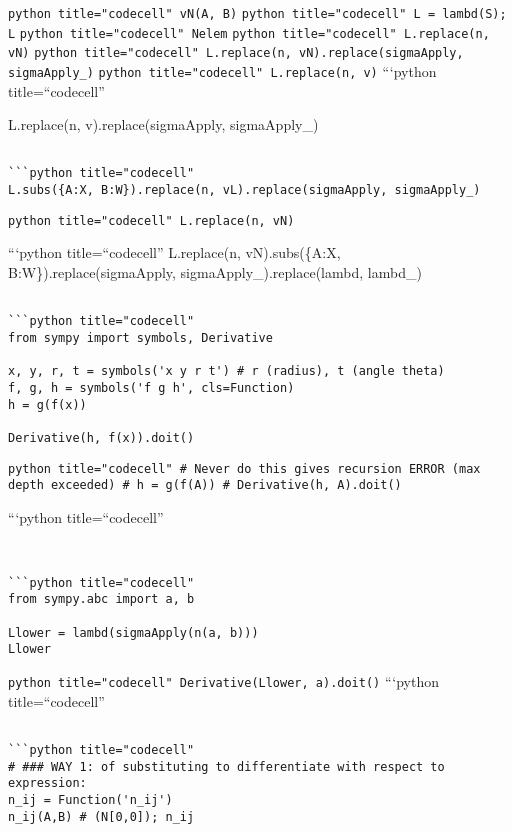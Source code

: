 \documentclass[
]{article}
\begin{document}
\texttt{python title="codecell" vN(A, B)}
\texttt{python title="codecell" L = lambd(S); L}
\texttt{python title="codecell" Nelem}
\texttt{python title="codecell" L.replace(n, vN)}
\texttt{python title="codecell" L.replace(n, vN).replace(sigmaApply, sigmaApply_)}
\texttt{python title="codecell" L.replace(n, v)} ```python
title=``codecell''

L.replace(n, v).replace(sigmaApply, sigmaApply\_)

\begin{verbatim}

```python title="codecell"
L.subs({A:X, B:W}).replace(n, vL).replace(sigmaApply, sigmaApply_)
\end{verbatim}

\texttt{python title="codecell" L.replace(n, vN)}

```python title=``codecell'' L.replace(n, vN).subs(\{A:X,
B:W\}).replace(sigmaApply, sigmaApply\_).replace(lambd, lambd\_)

\begin{verbatim}

```python title="codecell"
from sympy import symbols, Derivative

x, y, r, t = symbols('x y r t') # r (radius), t (angle theta)
f, g, h = symbols('f g h', cls=Function)
h = g(f(x))

Derivative(h, f(x)).doit()
\end{verbatim}

\texttt{python title="codecell" # Never do this gives recursion ERROR (max depth exceeded) # h = g(f(A)) # Derivative(h, A).doit()}

```python title=``codecell''

\begin{verbatim}


```python title="codecell"
from sympy.abc import a, b

Llower = lambd(sigmaApply(n(a, b)))
Llower
\end{verbatim}

\texttt{python title="codecell" Derivative(Llower, a).doit()}
```python title=``codecell''

\begin{verbatim}

```python title="codecell"
# ### WAY 1: of substituting to differentiate with respect to expression:
n_ij = Function('n_ij')
n_ij(A,B) # (N[0,0]); n_ij
\end{verbatim}
\end{document}
